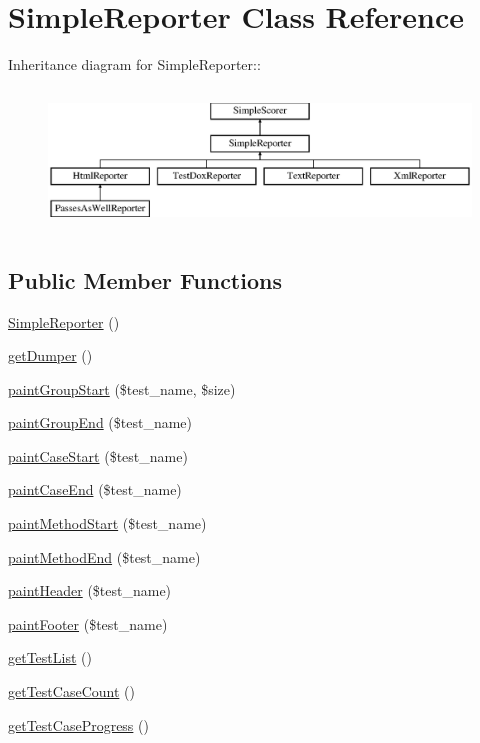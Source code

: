 \hypertarget{class_simple_reporter}{
\section{SimpleReporter Class Reference}
\label{class_simple_reporter}
}
Inheritance diagram for SimpleReporter::\begin{figure}[H]
\begin{center}
\leavevmode
\includegraphics[height=3.78378cm]{class_simple_reporter}
\end{center}
\end{figure}
\subsection*{Public Member Functions}
\begin{DoxyCompactItemize}
\item 
\hyperlink{class_simple_reporter_a7fd4aba19a7aa84b0a099f7d6b532a19}{SimpleReporter} ()
\item 
\hyperlink{class_simple_reporter_a784aae8c64539f2ac2f7bb8e9db65628}{getDumper} ()
\item 
\hyperlink{class_simple_reporter_a3e8ad3ae451da1c3ae1e90c5789f7f2b}{paintGroupStart} (\$test\_\-name, \$size)
\item 
\hyperlink{class_simple_reporter_a2b6b699cadeb44f4dc666f3c94ac22be}{paintGroupEnd} (\$test\_\-name)
\item 
\hyperlink{class_simple_reporter_a987d5bbfa2cc927da394f6bc6053c23e}{paintCaseStart} (\$test\_\-name)
\item 
\hyperlink{class_simple_reporter_a8e6c0fb28e29920fe42eef652f822753}{paintCaseEnd} (\$test\_\-name)
\item 
\hyperlink{class_simple_reporter_a54672d58e0fad0e0e672159dd4f61124}{paintMethodStart} (\$test\_\-name)
\item 
\hyperlink{class_simple_reporter_a0ad8baf509606e35dec1bbefddef3fc0}{paintMethodEnd} (\$test\_\-name)
\item 
\hyperlink{class_simple_reporter_a682fc7003bca1442734b7ddbdf270b75}{paintHeader} (\$test\_\-name)
\item 
\hyperlink{class_simple_reporter_a447a6e823a5c17b1bd5f922a0b18fded}{paintFooter} (\$test\_\-name)
\item 
\hyperlink{class_simple_reporter_aa4bce8bfcd41c7ec33a22866f2b170a9}{getTestList} ()
\item 
\hyperlink{class_simple_reporter_a218fb7c8ac145e848243d29d712fd27f}{getTestCaseCount} ()
\item 
\hyperlink{class_simple_reporter_aa9b00069b10e54522095ef9d65dddd44}{getTestCaseProgress} ()
\end{DoxyCompactItemize}
